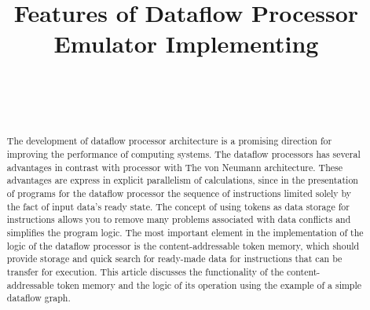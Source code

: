 \documentclass[
11pt,%
tightenlines,%
twoside,%
onecolumn,%
nofloats,%
nobibnotes,%
nofootinbib,%
superscriptaddress,%
noshowpacs,%
centertags]%
{revtex4}
\begin{document}

\title{Features of Dataflow Processor Emulator Implementing}

\author{~}

\author{~}



\begin{abstract}
The development of dataflow processor architecture is a promising direction for improving the performance of computing systems. The dataflow processors has several advantages in contrast with processor with The von Neumann architecture. These advantages are express in explicit parallelism of calculations, since in the presentation of programs for the dataflow processor the sequence of instructions limited solely by the fact of input data’s ready state. The concept of using tokens as data storage for instructions allows you to remove many problems associated with data conflicts and simplifies the program logic. The most important element in the implementation of the logic of the dataflow processor is the content-addressable token memory, which should provide storage and quick search for ready-made data for instructions that can be transfer for execution. This article discusses the functionality of the content-addressable token memory and the logic of its operation using the example of a simple dataflow graph.
\end{abstract}



\maketitle
\end{document}
